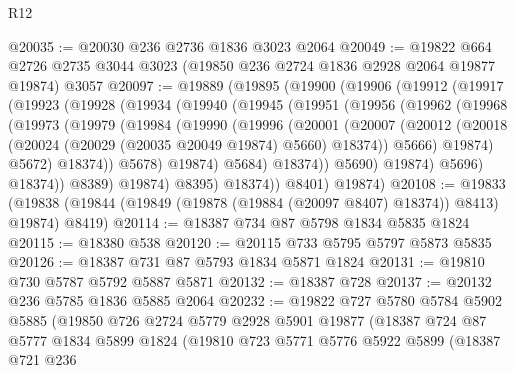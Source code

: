 \begin{lexlean}{R12}
\begin{coremodule}
@20035 := @20030 @236 @2736 @1836 @3023 @2064
@20049 := @19822
    @664
    @2726
    @2735
    @3044
    @3023
    (@19850 @236 @2724 @1836 @2928 @2064 @19877 @19874)
    @3057
@20097 := @19889
    (@19895
      (@19900
        (@19906
          (@19912
            (@19917
              (@19923
                (@19928
                  (@19934
                    (@19940
                      (@19945
                        (@19951
                          (@19956
                            (@19962
                              (@19968
                                (@19973
                                  (@19979
                                    (@19984
                                      (@19990
                                        (@19996
                                          (@20001
                                            (@20007
                                              (@20012
                                                (@20018
                                                  (@20024
                                                    (@20029 (@20035 @20049 @19874) @5660)
                                                    @18374))
                                                @5666)
                                              @19874)
                                            @5672)
                                          @18374))
                                      @5678)
                                    @19874)
                                  @5684)
                                @18374))
                            @5690)
                          @19874)
                        @5696)
                      @18374))
                  @8389)
                @19874)
              @8395)
            @18374))
        @8401)
      @19874)
@20108 := @19833
    (@19838 (@19844 (@19849 (@19878 (@19884 (@20097 @8407) @18374)) @8413) @19874) @8419)
@20114 := @18387 @734 @87 @5798 @1834 @5835 @1824
@20115 := @18380 @538
@20120 := @20115 @733 @5795 @5797 @5873 @5835
@20126 := @18387 @731 @87 @5793 @1834 @5871 @1824
@20131 := @19810 @730 @5787 @5792 @5887 @5871
@20132 := @18387 @728
@20137 := @20132 @236 @5785 @1836 @5885 @2064
@20232 := @19822
    @727
    @5780
    @5784
    @5902
    @5885
    (@19850
      @726
      @2724
      @5779
      @2928
      @5901
      @19877
      (@18387
        @724
        @87
        @5777
        @1834
        @5899
        @1824
        (@19810
          @723
          @5771
          @5776
          @5922
          @5899
          (@18387
            @721
            @236

\end{coremodule}
\end{lexlean}
